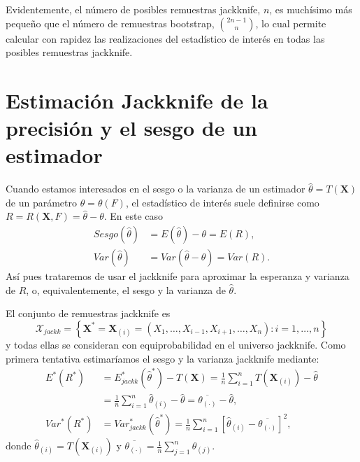 \documentclass[
]{book}
\theoremstyle{break}
\theoremstyle{definition}
\theoremstyle{definition}
\theoremstyle{definition}
\theoremstyle{definition}
\theoremstyle{remark}
\begin{document}
Evidentemente, el número de posibles remuestras jackknife, \(n\), es
muchísimo más pequeño que el número de remuestras bootstrap,
\(\binom{2n-1}{n}\), lo cual permite calcular con rapidez las realizaciones
del estadístico de interés en todas las posibles remuestras jackknife.

\hypertarget{estimaciuxf3n-jackknife-de-la-precisiuxf3n-y-el-sesgo-de-un-estimador}{%
\section{Estimación Jackknife de la precisión y el sesgo de un estimador}\label{estimaciuxf3n-jackknife-de-la-precisiuxf3n-y-el-sesgo-de-un-estimador}}

Cuando estamos interesados en el sesgo o la varianza de un estimador \(\hat{\theta}=T \left( \mathbf{X} \right)\) de un parámetro \(\theta =\theta \left( F \right)\), el estadístico de interés suele definirse como \(R=R\left( \mathbf{X},F \right) =\hat{\theta}-\theta\).
En este caso
\[\begin{aligned}
Sesgo\left( \hat{\theta} \right) &= E\left( \hat{\theta} \right) -\theta
=E\left( R \right), \\
Var\left( \hat{\theta} \right) &= Var\left( \hat{\theta}-\theta \right)
=Var\left( R \right).
\end{aligned}\]
Así pues trataremos de usar el jackknife para aproximar la esperanza y varianza de \(R\), o, equivalentemente, el sesgo y la varianza de \(\hat{\theta}\).

El conjunto de remuestras jackknife es
\[\mathcal{X}_{jackk}=\left\{ \mathbf{X}^{\ast}=
\mathbf{X}_{(i)}=\left( X_1,\ldots ,X_{i-1},X_{i+1},\ldots
,X_n \right) : i=1,\ldots ,n\right\}\]
y todas ellas se consideran con equiprobabilidad en el universo jackknife.
Como primera tentativa estimaríamos el sesgo y la varianza jackknife mediante:
\[\begin{aligned}
E^{\ast}\left( R^{\ast} \right) 
&= E_{jackk}^{\ast}\left( \hat{\theta}^{\ast} \right) - T \left( \mathbf{X} \right) 
= \frac{1}{n}\sum_{i=1}^{n}T \left( \mathbf{X}_{(i)} \right) - \hat{\theta} \\
&= \frac{1}{n}\sum_{i=1}^{n}\hat \theta_{(i)} - \hat{\theta} 
= \overline{\theta_{(\cdot)}}-\hat{\theta}, \\
Var^{\ast}\left( R^{\ast} \right) 
&= Var_{jackk}^{\ast}\left( \hat{\theta}^{\ast} \right) 
= \frac{1}{n}\sum_{i=1}^{n}\left[ \hat \theta_{(i)} 
- \overline{\theta_{(\cdot)}}\right]^2,
\end{aligned}\]
donde \(\hat \theta_{(i)} = T \left( \mathbf{X}_{(i)} \right)\) y \(\overline{\theta_{(\cdot)}} = \frac{1}{n}\sum_{j=1}^{n}\hat \theta_{(j)}\).
\end{document}
